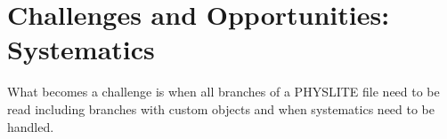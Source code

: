 \section{Challenges and Opportunities: Systematics}\label{sec:challenges}

What becomes a challenge is when all branches of a PHYSLITE file need to be read including branches with custom objects and when systematics need to be handled.
